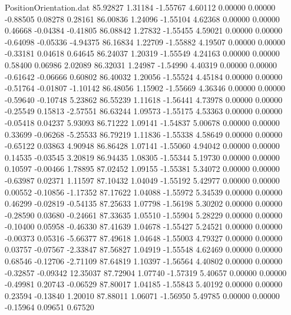 \begin{filecontents}{PositionOrientation.dat}
  85.92827    1.31184   -1.55767     4.60112    0.00000    0.00000   -0.88505    0.08278    0.28161
  86.00836    1.24096   -1.55104     4.62368    0.00000    0.00000    0.46668   -0.04384   -0.41805
  86.08842    1.27832   -1.55455     4.59021    0.00000    0.00000   -0.64098   -0.05336   -4.94375
  86.16834    1.22709   -1.55882     4.19507    0.00000    0.00000   -0.33181    0.04618    0.64645
  86.24037    1.20319   -1.55549     4.24163    0.00000    0.00000    0.58400    0.06986    2.02089
  86.32031    1.24987   -1.54990     4.40319    0.00000    0.00000   -0.61642   -0.06666    0.60802
  86.40032    1.20056   -1.55524     4.45184    0.00000    0.00000   -0.51764   -0.01807   -1.10142
  86.48056    1.15902   -1.55669     4.36346    0.00000    0.00000   -0.59640   -0.10748    5.23862
  86.55239    1.11618   -1.56441     4.73978    0.00000    0.00000   -0.25549    0.15813   -2.57551
  86.63244    1.09573   -1.55175     4.53363    0.00000    0.00000   -0.05418    0.04237    5.93093
  86.71222    1.09141   -1.54837     5.00678    0.00000    0.00000    0.33699   -0.06268   -5.25533
  86.79219    1.11836   -1.55338     4.58649    0.00000    0.00000   -0.65122    0.03863    4.90948
  86.86428    1.07141   -1.55060     4.94042    0.00000    0.00000    0.14535   -0.03545    3.20819
  86.94435    1.08305   -1.55344     5.19730    0.00000    0.00000    0.10597   -0.00466    1.78895
  87.02452    1.09155   -1.55381     5.34072    0.00000    0.00000   -0.63987    0.02371    1.11597
  87.10432    1.04049   -1.55192     5.42977    0.00000    0.00000    0.00552   -0.10856   -1.17352
  87.17622    1.04088   -1.55972     5.34539    0.00000    0.00000    0.46299   -0.02819   -0.54135
  87.25633    1.07798   -1.56198     5.30202    0.00000    0.00000   -0.28590    0.03680   -0.24661
  87.33635    1.05510   -1.55904     5.28229    0.00000    0.00000   -0.10400    0.05958   -0.46330
  87.41639    1.04678   -1.55427     5.24521    0.00000    0.00000   -0.00373    0.05316   -5.66377
  87.49618    1.04648   -1.55003     4.79327    0.00000    0.00000    0.03757   -0.07567   -2.33847
  87.56827    1.04919   -1.55548     4.62469    0.00000    0.00000    0.68546   -0.12706   -2.71109
  87.64819    1.10397   -1.56564     4.40802    0.00000    0.00000   -0.32857   -0.09342   12.35037
  87.72904    1.07740   -1.57319     5.40657    0.00000    0.00000   -0.49981    0.20743   -0.06529
  87.80017    1.04185   -1.55843     5.40192    0.00000    0.00000    0.23594   -0.13840    1.20010
  87.88011    1.06071   -1.56950     5.49785    0.00000    0.00000   -0.15964    0.09651    0.67520

\end{filecontents}
